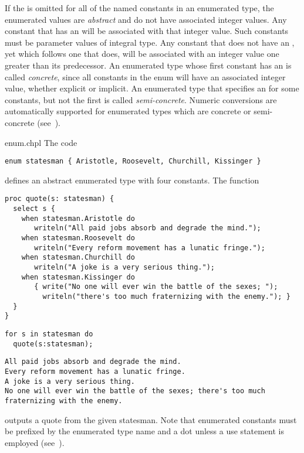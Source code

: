 If the  is omitted for all of the named constants in
an enumerated type, the enumerated values are \emph{abstract} and do
not have associated integer values.  Any constant that has an
 will be associated with that integer value.  Such
constants must be parameter values of integral type.  Any constant
that does not have an , yet which follows one that
does, will be associated with an integer value one greater than its
predecessor.  An enumerated type whose first constant has
an  is called \emph{concrete}, since all constants in
the enum will have an associated integer value, whether explicit or
implicit.  An enumerated type that specifies an  for
some constants, but not the first is called \emph{semi-concrete}.
Numeric conversions are automatically supported for enumerated types
which are concrete or semi-concrete
(see~).

\begin{chapelexample}{enum.chpl}
The code
\begin{chapel}
\begin{verbatim}
enum statesman { Aristotle, Roosevelt, Churchill, Kissinger }
\end{verbatim}
\end{chapel}
defines an abstract enumerated type with four constants.  The function
\begin{chapel}
\begin{verbatim}
proc quote(s: statesman) {
  select s {
    when statesman.Aristotle do
       writeln("All paid jobs absorb and degrade the mind.");
    when statesman.Roosevelt do
       writeln("Every reform movement has a lunatic fringe.");
    when statesman.Churchill do
       writeln("A joke is a very serious thing.");
    when statesman.Kissinger do
       { write("No one will ever win the battle of the sexes; ");
         writeln("there's too much fraternizing with the enemy."); }
  }
} 
\end{verbatim}
\end{chapel}
\begin{chapelnoprint}
\begin{verbatim}
for s in statesman do
  quote(s:statesman);
\end{verbatim}
\end{chapelnoprint}
\begin{chapeloutput}
\begin{verbatim}
All paid jobs absorb and degrade the mind.
Every reform movement has a lunatic fringe.
A joke is a very serious thing.
No one will ever win the battle of the sexes; there's too much fraternizing with the enemy.
\end{verbatim}
\end{chapeloutput}
outputs a quote from the given statesman.  Note that enumerated
constants must be prefixed by the enumerated type name and a dot unless a
use statement is employed (see~).
\end{chapelexample}

